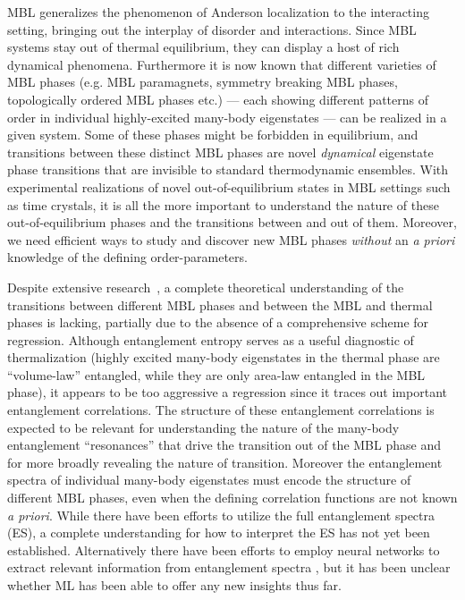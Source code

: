 \documentclass[amsmath,amssymb, aps, prb, superscriptaddress,twocolumn]{revtex4-1}
\begin{document}
MBL generalizes the phenomenon of Anderson localization to the interacting setting, bringing out the interplay of disorder and interactions. Since MBL systems stay out of thermal equilibrium, they can display a host of rich dynamical phenomena\cite{Huse14, Serbyn13cons, Imbrie2016,VasseurRevivals,KhemaniNonLocal,Gopalakrishnan15}. Furthermore it is now known that different varieties of MBL phases (e.g. MBL paramagnets, symmetry breaking MBL phases, topologically ordered MBL phases etc.) --- each showing different patterns of order in individual highly-excited many-body eigenstates --- can be realized in a given system\cite{Huse13, PekkerHilbertGlass, Bauer13, Chandran14, Bahri15}. Some of these phases might be forbidden in equilibrium, and transitions between these distinct MBL phases %
are novel \emph{dynamical} eigenstate phase transitions that are invisible to standard thermodynamic ensembles.
With experimental realizations of novel out-of-equilibrium states in MBL settings such as time crystals\cite{Khemani15, Q, CVS, MishaTCExp, MonroeTCExp}, it is all the more important to understand the nature of these out-of-equilibrium phases and the transitions between and out of them. Moreover, we need efficient ways to study and discover new MBL phases \emph{without} an \emph{a priori} knowledge of the defining order-parameters.   

Despite extensive research~\cite{PalHuse, Luitz15, VHA,PVP,GroverCP,SerbynCriterion, ClarkBimodal,KhemaniCP, KhemaniCPQP}, a complete theoretical understanding of the transitions between different MBL phases and between the MBL and thermal phases is lacking, partially due to the absence of a comprehensive scheme for regression. Although entanglement entropy serves as a useful diagnostic of thermalization (highly excited many-body eigenstates in the thermal phase are “volume-law” entangled, while they are only area-law entangled in the MBL phase\cite{PalHuse,Bauer13}), it appears to be too aggressive a regression since it traces out important entanglement correlations. The structure of these entanglement correlations is expected to be relevant for understanding the nature of the many-body entanglement ``resonances'' that drive the transition out of the MBL phase\cite{VHA,PVP,KhemaniCPQP} and for more broadly revealing the nature of transition. Moreover the entanglement spectra of individual many-body eigenstates must encode the structure of different MBL phases, even when the defining correlation functions are not known \emph{a priori}. While there have been efforts to utilize the full entanglement spectra (ES)\cite{GeraedtsES1, GeraedtsES2}, a complete understanding for how to interpret the ES has not yet been established. 
Alternatively there have been efforts to employ neural networks to extract relevant information from entanglement spectra 
\cite{Neupert2017,Huber2017}, but it has been unclear whether ML has been able to offer any new insights thus far. 
\end{document}
